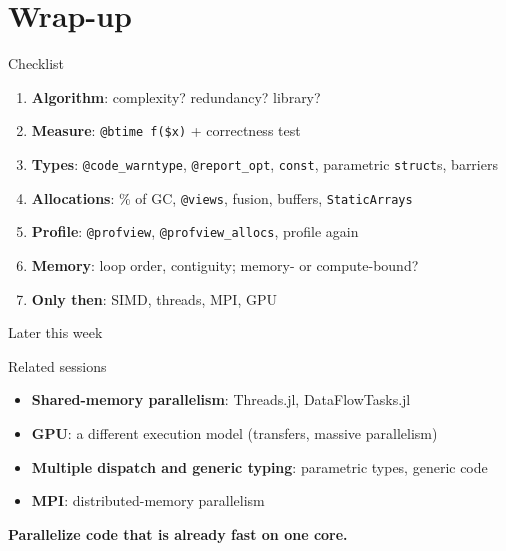 \section{Wrap-up}

\begin{frame}{Checklist}
    \begin{enumerate}
        \item \textbf{Algorithm}: complexity? redundancy? library?
        \item \textbf{Measure}: \texttt{@btime f(\$x)} + correctness test
        \item \textbf{Types}: \texttt{@code\_warntype}, \texttt{@report\_opt}, \texttt{const}, parametric \texttt{struct}s, barriers
        \item \textbf{Allocations}: \% of GC, \texttt{@views}, fusion, buffers, \texttt{StaticArrays}
        \item \textbf{Profile}: \texttt{@profview}, \texttt{@profview\_allocs}, profile again
        \item \textbf{Memory}: loop order, contiguity; memory- or compute-bound?
        \item \textbf{Only then}: SIMD, threads, MPI, GPU
    \end{enumerate}
\end{frame}

\begin{frame}{Later this week}
    \begin{BlockBlue}{Related sessions}
        \begin{itemize}
            \item \textbf{Shared-memory parallelism}: Threads.jl, DataFlowTasks.jl
            \item \textbf{GPU}: a different execution model (transfers, massive parallelism)
            \item \textbf{Multiple dispatch and generic typing}: parametric types, generic code
            \item \textbf{MPI}: distributed-memory parallelism
        \end{itemize}
    \end{BlockBlue}

    \bigskip

    \alert{\textbf{Parallelize code that is already fast on one core.}}
\end{frame}

